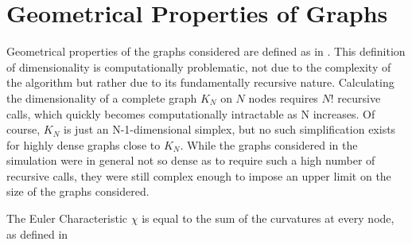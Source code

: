 \documentclass[prd,12pt,nofootinbib]{revtex4}
\begin{document}
\section{Geometrical Properties of Graphs}
Geometrical properties of the graphs considered are defined as in \cite{Knill:2011}. This definition of dimensionality is computationally problematic, not due to the complexity of the algorithm but rather due to its fundamentally recursive nature. Calculating the dimensionality of a complete graph $K_N$  on $N$ nodes requires $N!$ recursive calls, which quickly becomes computationally intractable as N increases. Of course, $K_N$ is just an N-1-dimensional simplex, but no such simplification exists for highly dense graphs close to $K_N$. While the graphs considered in the simulation were in general not so dense as to require such a high number of recursive calls, they were still complex enough to impose an upper limit on the size of the graphs considered.

The Euler Characteristic $\chi$ is equal to the sum of the curvatures at every node, as defined in \cite{Knill:2011}
\end{document}
